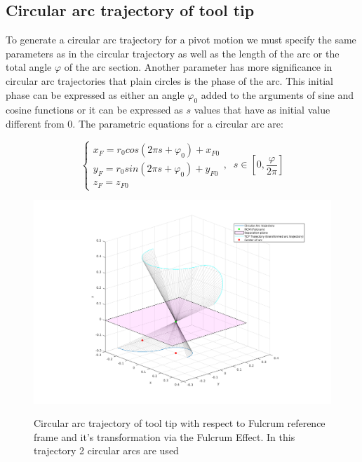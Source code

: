 \subsection{Circular arc trajectory of tool tip}

To generate a circular arc trajectory for a pivot motion we must specify the same parameters as 
in the circular trajectory as well as the length of the arc or the total angle $φ$ of the arc 
section. Another parameter has more significance in circular arc trajectories that plain circles is the phase of the arc. This initial phase can be expressed as either an angle $φ_0$ added to the arguments of 
sine and cosine functions or it can be expressed as $s$ values that have as initial value different from $0$. The parametric equations for a circular arc are:

\begin{equation}
\begin{cases}
x^{}_{F} = r_0cos(2πs + φ_0) + x^{}_{F0} \\
y^{}_{F} = r_0sin(2πs + φ_0) + y^{}_{F0} \\
z^{}_{F} = z^{}_{F0}
\end{cases} ,
\;\;
s \in \left[ 0, \frac{φ}{2π} \right]
\end{equation}

\begin{center}
\begin{figure}[!htb]
\centering
\includegraphics[width=\textwidth]{images/rcm_trajectories/rcm_arcs_traj.png}\\
\caption{Circular arc trajectory of tool tip with respect to Fulcrum reference frame and it's transformation via the Fulcrum Effect. In this trajectory 2 circular arcs are used}
\end{figure}
\end{center}

